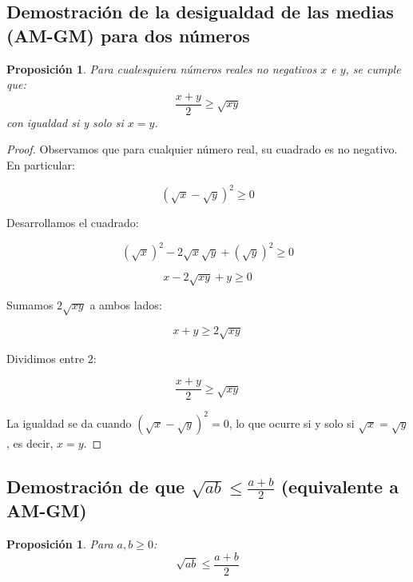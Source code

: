 \documentclass[12pt,final]{report}
\theoremstyle{plain}
\newtheorem{proposition}[theorem]{Proposición}
\theoremstyle{definition}
\begin{document}
\newpage

\subsection{Demostración de la desigualdad de las medias (AM-GM) para dos números}

\begin{proposition}
Para cualesquiera números reales no negativos $x$ e $y$, se cumple que:
\[
\frac{x+y}{2} \geq \sqrt{xy}
\]
con igualdad si y solo si $x = y$.
\end{proposition}

\begin{proof}

Observamos que para cualquier número real, su cuadrado es no negativo. En particular:

\[
(\sqrt{x} - \sqrt{y})^2 \geq 0
\]

Desarrollamos el cuadrado:

\[
(\sqrt{x})^2 - 2\sqrt{x}\sqrt{y} + (\sqrt{y})^2 \geq 0
\]

\[
x - 2\sqrt{xy} + y \geq 0
\]

Sumamos $2\sqrt{xy}$ a ambos lados:

\[
x + y \geq 2\sqrt{xy}
\]

Dividimos entre $2$:

\[
\frac{x+y}{2} \geq \sqrt{xy}
\]

La igualdad se da cuando $(\sqrt{x} - \sqrt{y})^2 = 0$, lo que ocurre si y solo si $\sqrt{x} = \sqrt{y}$, es decir, $x = y$.

\end{proof}

\newpage


\subsection{Demostración de que $\sqrt{ab} \leq \frac{a+b}{2}$ (equivalente a AM-GM)}

\begin{proposition}
Para $a, b \geq 0$:
\[
\sqrt{ab} \leq \frac{a+b}{2}
\]
\end{proposition}
\end{document}
